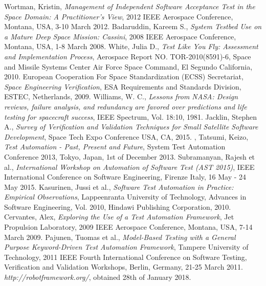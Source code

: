 \documentclass[english,12pt,a4paper,pdftex,elec,utf8]{aaltothesis}
\begin{document}
\begin{thebibliography}{99}
 Wortman, Kristin,
  \textit{Management of Independent Software Acceptance Test in the Space Domain: A Practitioner's View}, 2012 IEEE Aerospace Conference, Montana, USA, 3-10 March 2012.
 Badaruddin, Kareem S.,
  \textit{System Testbed Use on a Mature Deep Space Mission: Cassini}, 2008 IEEE Aerospace Conference, Montana, USA, 1-8 March 2008.
 White, Julia D.,
  \textit{Test Like You Fly: Assessment and Implementation Process}, Aerospace Report NO.
TOR-2010(8591)-6, Space and Missile Systems Center Air Force Space Command, El Segundo California, 2010.
 European Cooperation For Space Standardization (ECSS) Secretariat,
  \textit{Space Engineering Verification}, ESA Requirements and Standards Division, ESTEC, Netherlands, 2009.
 Williams, W. C.,
  \textit{Lessons from NASA: Design reviews, failure analysis, and redundancy are favored over predictions and life testing for spacecraft success}, IEEE Spectrum, Vol. 18:10, 1981.
 Jacklin, Stephen A.,
  \textit{Survey of Verification and Validation Techniques for Small Satellite Software Development}, Space Tech Expo Conference USA, CA, 2015.
, Tatsumi, Keizo,
  \textit{Test Automation - Past, Present and Future}, System Test Automation Conference 2013,  Tokyo, Japan, 1st of December 2013.
 Subramanyan, Rajesh et al.,
  \textit{ International Workshop on Automation of Software Test (AST 2015)},  IEEE International Conference on Software Engineering, Firenze Italy, 16 May - 24 May 2015.
 Kasurinen, Jussi et al.,
  \textit{Software Test Automation in Practice: Empirical Observations}, Lappeenranta University of Technology, Advances in Software Engineering, Vol. 2010, Hindawi Publishing Corporation, 2010.
 Cervantes, Alex,
  \textit{Exploring the Use of a Test Automation Framework}, Jet Propulsion Laboratory, 2009 IEEE Aerospace Conference, Montana, USA, 7-14 March 2009.
 Pajunen, Tuomas et al.,
  \textit{Model-Based Testing with a General Purpose Keyword-Driven Test Automation
Framework}, Tampere University of Technology, 2011 IEEE Fourth International Conference on Software Testing, Verification and Validation Workshops, Berlin, Germany, 21-25 March 2011.  
  \textit{http://robotframework.org/}, obtained 28th of January 2018.

\end{thebibliography}
\end{document}
